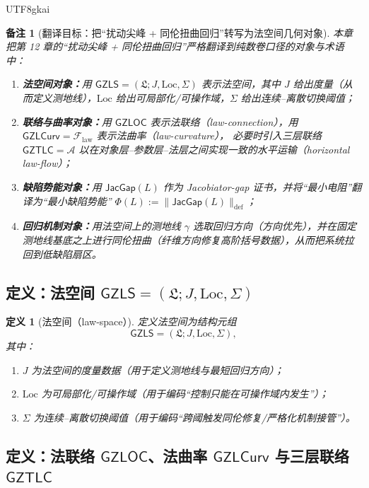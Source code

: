 \documentclass[12pt]{article}
\newtheorem{definition}{定义}[section]
\newtheorem{remark}{备注}[section]
\newcommand{\GZLS}{\ensuremath{\mathsf{GZLS}}}
\newcommand{\GZLOC}{\ensuremath{\mathsf{GZLOC}}}
\newcommand{\GZLCurv}{\ensuremath{\mathsf{GZLCurv}}}
\newcommand{\GZTLC}{\ensuremath{\mathsf{GZTLC}}}
\newcommand{\JacGap}{\ensuremath{\mathsf{JacGap}}}
\begin{document}
\begin{CJK*}{UTF8}{gkai}
\begin{remark}[翻译目标：把“扰动尖峰 + 同伦扭曲回归”转写为法空间几何对象]
本章把第 12 章的“扰动尖峰 + 同伦扭曲回归”严格翻译到纯数卷口径的对象与术语中：
\begin{enumerate}
  \item \textbf{法空间对象：}用 $\GZLS=(\mathfrak{L};J,\mathrm{Loc},\Sigma)$ 表示法空间，其中 $J$ 给出度量（从而定义测地线），$\mathrm{Loc}$
    给出可局部化/可操作域，$\Sigma$ 给出连续–离散切换阈值；
  \item \textbf{联络与曲率对象：}用 $\GZLOC$ 表示法联络（law-connection），用 $\GZLCurv=\mathcal{F}_{\mathrm{law}}$ 表示法曲率（law-curvature），
    必要时引入三层联络 $\GZTLC=\mathcal{A}$ 以在对象层–参数层–法层之间实现一致的水平运输（horizontal law-flow）；
  \item \textbf{缺陷势能对象：}用 $\JacGap(L)$ 作为 Jacobiator-gap 证书，并将“最小电阻”翻译为“最小缺陷势能” $\Phi(L):=\|\JacGap(L)\|_{\mathrm{def}}$；

  \item \textbf{回归机制对象：}用法空间上的测地线 $\gamma$ 选取回归方向（方向优先），并在固定测地线基底之上进行同伦扭曲（纤维方向修复高阶括号数据），从而把系统拉回到低缺陷扇区。
\end{enumerate}
\end{remark}

\subsection{定义：法空间 $\GZLS=(\mathfrak{L};J,\mathrm{Loc},\Sigma)$}

\begin{definition}[法空间（law-space）]
\label{def:law-space-gzls}
定义法空间为结构元组
\[
\GZLS=(\mathfrak{L};J,\mathrm{Loc},\Sigma),
\]
其中：
\begin{enumerate}
  \item $J$ 为法空间的度量数据（用于定义测地线与最短回归方向）；
  \item $\mathrm{Loc}$ 为可局部化/可操作域（用于编码“控制只能在可操作域内发生”）；
  \item $\Sigma$ 为连续–离散切换阈值（用于编码“跨阈触发同伦修复/严格化机制接管”）。
\end{enumerate}
\end{definition}

\subsection{定义：法联络 $\GZLOC$、法曲率 $\GZLCurv$ 与三层联络 $\GZTLC$}


\end{CJK*}
\end{document}
